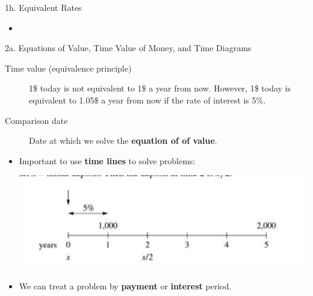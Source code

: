 \begin{CHPT_SUMM_AUTO}[label = {L.-1h}]{1h. Equivalent Rates}
	\begin{itemize}[leftmargin = *]
		\item	
	\end{itemize}
\end{CHPT_SUMM_AUTO}

\begin{CHPT_SUMM_AUTO}[label = {L.-2a}]{{2a. Equations of Value, Time Value of Money, and Time Diagrams}}
\begin{description}
	\item[Time value (equivalence principle)]	1\$ today is not equivalent to 1\$ a year from now. However, 1\$ today is equivalent to 1.05\$ a year from now if the rate of interest is 5\%. 
	\item[Comparison date]	Date at which we solve the \textbf{equation of of value}.
\end{description}
	\begin{itemize}[leftmargin = *]
		\item	Important to use \textbf{time lines} to solve problems:
		\begin{center}
		\includegraphics[scale=0.4]{img/time-value-timeline.png}
		\end{center}
		\item	We can treat a problem by \textbf{payment} or \textbf{interest} period.
	\end{itemize}
\end{CHPT_SUMM_AUTO}

